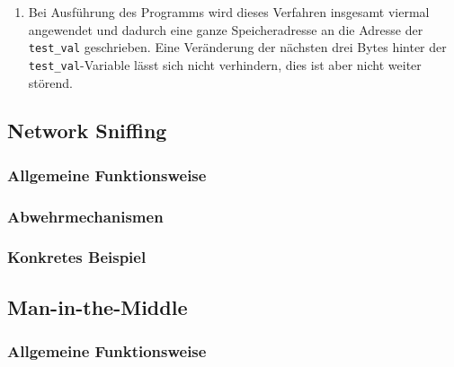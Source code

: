 \documentclass[11pt, a4paper]{article}
\begin{document}
\begin{enumerate}
	\paragraph{Wrapping Around}
	Ein Byte entspricht einem Zeichen bestehend aus acht \gls{bit}. Die Binärzahl \texttt{11111111} entspricht der Dezimalzahl \(255\). Bei Erhöhung um eins bekommt die Binärzahl ein neuntes Zeichen und sieht wie folgt aus: \texttt{100000000}. In diesem Fall sind nur die letzten acht \glspl{bit} von Bedeutung. Diese bleiben bei einer Erhöhung der Zahl um die Dezimalzahl \(256\) gleich. Dadurch lässt sich das Problem der bereits zu hohen Anzahl gedruckter Zeichen eifach lösen, indem statt der ursprünglichen Zahl die nächsthöhere Zahl in Schritten von 256 verwendet wird. 
	
	\item Bei Ausführung des Programms wird dieses Verfahren insgesamt viermal angewendet und dadurch eine ganze Speicheradresse an die Adresse der \texttt{test\_val} geschrieben. Eine Veränderung der nächsten drei Bytes hinter der \texttt{test\_val}-Variable lässt sich nicht verhindern, dies ist aber nicht weiter störend. 
\end{enumerate}

\subsection{Network Sniffing}

\subsubsection{Allgemeine Funktionsweise}

\subsubsection{Abwehrmechanismen}

\subsubsection{Konkretes Beispiel}


\subsection{Man-in-the-Middle}

\subsubsection{Allgemeine Funktionsweise}
\end{document}
